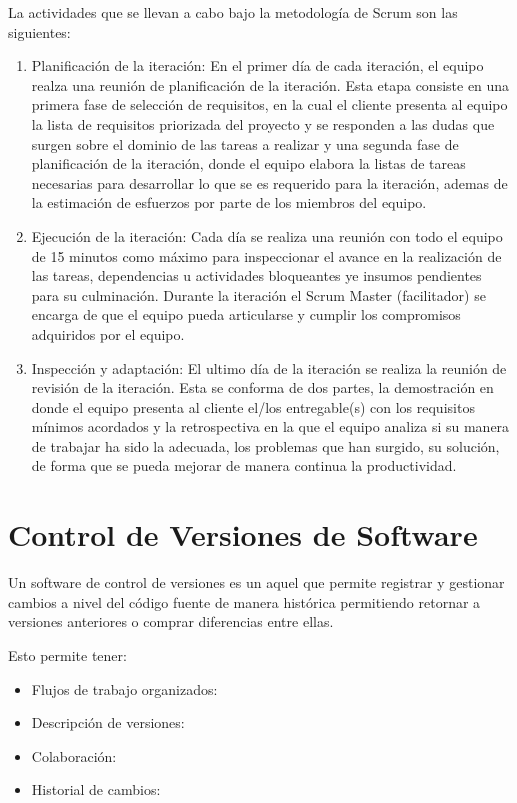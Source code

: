 La actividades que se llevan a cabo bajo la metodología de Scrum son las siguientes:

\begin{enumerate}
\item Planificación de la iteración: En el primer día de cada iteración, el equipo realza una reunión de planificación de la iteración. Esta etapa consiste en una primera fase de selección de requisitos, en la cual el cliente presenta al equipo la lista de requisitos priorizada del proyecto y se responden a las dudas que surgen sobre el dominio de las tareas a realizar y una segunda fase de planificación de la iteración, donde el equipo elabora la listas de tareas necesarias para desarrollar lo que se es requerido para la iteración, ademas de la estimación de esfuerzos por parte de los miembros del equipo.
\item Ejecución de la iteración: Cada día se realiza una reunión con todo el equipo de 15 minutos como máximo para inspeccionar el avance en la realización de las tareas, dependencias u actividades bloqueantes ye insumos pendientes para su culminación. Durante la iteración el Scrum Master (facilitador) se encarga de que el equipo pueda articularse y cumplir los compromisos adquiridos por el equipo.
\item Inspección y adaptación: El ultimo día de la iteración se realiza la reunión de revisión de la iteración. Esta se conforma de dos partes, la demostración en donde el equipo presenta al cliente el/los entregable(s) con los requisitos mínimos acordados y la retrospectiva en la que el equipo analiza si su manera de trabajar ha sido la adecuada, los problemas que han surgido, su solución, de forma que se pueda mejorar de manera continua la productividad.
\end{enumerate}

\section{Control de Versiones de Software}
Un software de control de versiones es un aquel que permite registrar y gestionar cambios a nivel del código fuente de manera histórica permitiendo retornar a versiones anteriores o comprar diferencias entre ellas.

Esto permite tener:
\begin{itemize}
\item Flujos de trabajo organizados:
\item Descripción de versiones:
\item Colaboración:
\item Historial de cambios: 
\end{itemize}

